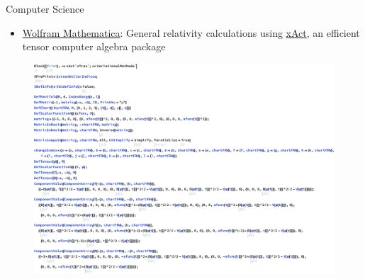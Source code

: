 \documentclass[9pt,aspectratio=169,hyperref=colorlinks]{beamer}
\begin{document}
\begin{frame}{Computer Science}
    \begin{itemize}
        \item \href{https://www.wolfram.com/mathematica/}{Wolfram Mathematica}: General relativity calculations using \href{http://xact.es/index.html}{xAct}, an efficient tensor computer algebra package
    \end{itemize}

    \begin{figure}
        \centering
        \includegraphics[scale=0.29]{CV/figs/2211.13233.1.pdf}
    \end{figure}
\end{frame}
\end{document}

